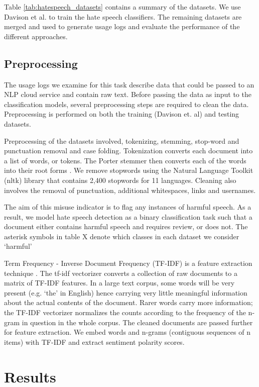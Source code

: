\documentclass[a4paper,12pt]{report}
\begin{document}
Table \ref{tab:hatespeech_datasets} contains a summary of the datasets. We use Davison et al. to train the hate speech classifiers. The remaining datasets are merged and used to generate usage logs and evaluate the performance of the different approaches.

\subsection{Preprocessing}
The usage logs we examine for this task describe data that could be passed to an NLP cloud service and contain raw text. Before passing the data as input to the classification models, several preprocessing steps are required to clean the data. Preprocessing is performed on both the training (Davison et. al) and testing datasets.

Preprocessing of the datasets involved, tokenizing, stemming, stop-word and punctuation removal and case folding. Tokenization converts each document into a list of words, or tokens. The Porter stemmer then converts each of the words into their root forms \cite{porter1997readings}. We remove stopwords using the Natural Language Toolkit (nltk) library that contains 2,400 stopwords for 11 languages. Cleaning also involves the removal of punctuation, additional whitespaces, links and usernames.

The aim of this misuse indicator is to flag any instances of harmful speech. As a result, we model hate speech detection as a binary classification task such that a document either contains harmful speech and requires review, or does not. The asterisk symbols in table X denote which classes in each dataset we consider `harmful’

Term Frequency - Inverse Document Frequency (TF-IDF) is a feature extraction technique \cite{ramos2003using}. The tf-idf vectorizer converts a collection of raw documents to a matrix of TF-IDF features. In a large text corpus, some words will be very present (e.g. `the’ in English) hence carrying very little meaningful information about the actual contents of the document. Rarer words carry more information; the TF-IDF vectorizer normalizes the counts according to the frequency of the n-gram in question in the whole corpus. The cleaned documents are passed further for feature extraction. We embed words and n-grams (contiguous sequences of n items) with TF-IDF and extract sentiment polarity scores.

\section{Results}
\end{document}

